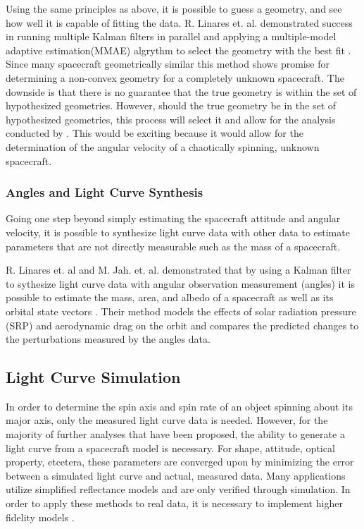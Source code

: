 \documentclass{article}
\begin{document}
Using the same principles as above, it is possible to guess a geometry, and see how well it is capable of fitting the data. R. Linares et. al. demonstrated success in running multiple Kalman filters in parallel and applying a multiple-model adaptive estimation(MMAE) algrythm to select the geometry with the best fit \cite{SpaceObjectCharacterization}. Since many spacecraft geometrically similar this method shows promise for determining a non-convex geometry for a completely unknown spacecraft. The downside is that there is no guarantee that the true geometry is within the set of hypothesized geometries. However, should the true geometry be in the set of hypothesized geometries, this process will select it and allow for the analysis conducted by \cite{AttitudeEstimationFromLightCurve}. This would be exciting because it would allow for the determination of the angular velocity of a chaotically spinning, unknown spacecraft.

\subsubsection{Angles and Light Curve Synthesis}

Going one step beyond simply estimating the spacecraft attitude and angular velocity, it is possible to synthesize light curve data with other data to estimate parameters that are not directly measurable such as the mass of a spacecraft.

R. Linares et. al  and M. Jah. et. al. demonstrated that by using a Kalman filter to sythesize light curve data with angular observation measurement (angles) it is possible to estimate the mass, area, and albedo of a spacecraft \cite{LINARES20141} as well as its orbital state vectors \cite{StateAndParameter}. Their method models the effects of solar radiation pressure (SRP) and aerodynamic drag on the orbit and compares the predicted changes to the perturbations measured by the angles data. 

\subsection{Light Curve Simulation}

In order to determine the spin axis and spin rate of an object spinning about its major axis, only the measured light curve data is needed. However, for the majority of further analyses that have been proposed, the ability to generate a light curve from a spacecraft model is necessary. For shape, attitude, optical property, etcetera, these parameters are converged upon by minimizing the error between a simulated light curve and actual, measured data. Many applications utilize simplified reflectance models and are only verified through simulation. In order to apply these methods to real data, it is necessary to implement higher fidelity models \cite{AttitudeEstimationFromLightCurve}.
\end{document}
